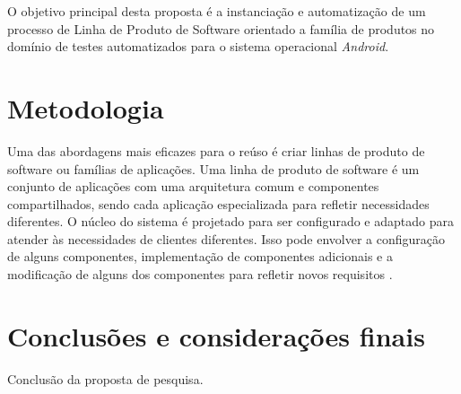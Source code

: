 \documentclass[12pt,a4paper]{article}
\begin{document}
O objetivo principal desta proposta é a instanciação e automatização de um processo de Linha de Produto de Software orientado a família de produtos no domínio de testes automatizados para o sistema operacional \textit{Android}.
\section{Metodologia}
Uma das abordagens mais eficazes para o reúso é criar linhas de produto de software ou famílias de aplicações. Uma linha de produto de software é um conjunto de aplicações com uma arquitetura comum e componentes compartilhados, sendo cada aplicação especializada para refletir necessidades diferentes. O núcleo do sistema é projetado para ser configurado e adaptado para atender às necessidades de clientes diferentes. Isso pode envolver a configuração de alguns componentes, implementação de componentes adicionais e a modificação de alguns dos componentes para refletir novos requisitos \cite{Sommerville2011}.

\section{Conclusões e considerações finais}
Conclusão da proposta de pesquisa.

\newpage


\end{document}

